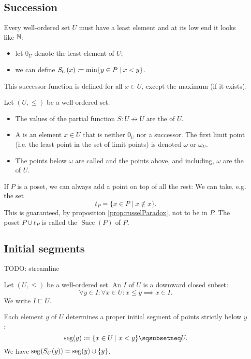 \subsection{Succession}
Every well-ordered set $U$ must have a least element and at its low end it looks like $\mathbb{N}$:
\begin{itemize}
\item let $0_U$ denote the least element of $U$;
\item we can define $S_U(x) \coloneqq \min\{y\in P\;|\;x<y\}$.
\end{itemize}
This successor function is defined for all $x\in U$, except the maximum (if it exists).

\begin{definition}
Let $(U,\leq)$ be a well-ordered set.
\begin{itemize}
\item The values of the partial function $S: U\not\to U$ are the  of $U$.
\item A  is an element $x\in U$ that is neither $0_U$ nor a successor. The first limit point (i.e. the least point in the set of limit points) is denoted $\omega$ or $\omega_U$.
\item The points below $\omega$ are called  and the points above, and including, $\omega$ are the  of $U$.
\end{itemize}
\end{definition}

If $P$ is a poset, we can always add a point on top of all the rest: We can take, e.g. the set
\[ t_P = \{ x\in P\;|\;x\notin x \}. \]
This is guaranteed, by proposition \ref{prop:russelParadox}, not to be in $P$.
The poset $P\cup t_P$ is called the  $\operatorname{Succ}(P)$ of $P$.

\subsection{Initial segments}
TODO: streamline
\begin{definition}
Let $(U,\leq)$ be a well-ordered set. An  $I$ of $U$ is a downward closed subset:
\[ \forall y\in I: \forall x\in U: x\leq y \implies x\in I. \]
We write $I \sqsubseteq U$.
\end{definition}
Each element $y$ of $U$ determines a proper initial segment of points strictly below $y$:
\[ \seg(y) \defeq \{ x\in U\;|\; x < y \} \sqsubsetneq U. \]
We have $\operatorname{seg}(S_U(y)) = \operatorname{seg}(y)\cup\{y\}$.

